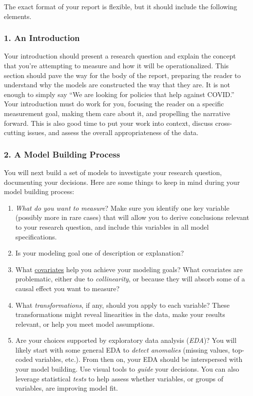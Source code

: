 \documentclass[
]{article}
\providecommand{\tightlist}{%
  \setlength{\itemsep}{0pt}\setlength{\parskip}{0pt}}
\begin{document}
The exact format of your report is flexible, but it should include the
following elements.

\hypertarget{an-introduction}{%
\subsubsection{1. An Introduction}\label{an-introduction}}

Your introduction should present a research question and explain the
concept that you're attempting to measure and how it will be
operationalized. This section should pave the way for the body of the
report, preparing the reader to understand why the models are
constructed the way that they are. It is not enough to simply say ``We
are looking for policies that help against COVID.'' Your introduction
must do work for you, focusing the reader on a specific measurement
goal, making them care about it, and propelling the narrative forward.
This is also good time to put your work into context, discuss
cross-cutting issues, and assess the overall appropriateness of the
data.

\hypertarget{a-model-building-process}{%
\subsubsection{2. A Model Building
Process}\label{a-model-building-process}}

You will next build a set of models to investigate your research
question, documenting your decisions. Here are some things to keep in
mind during your model building process:

\begin{enumerate}
\def\labelenumi{\arabic{enumi}.}
\tightlist
\item
  \emph{What do you want to measure}? Make sure you identify one key
  variable (possibly more in rare cases) that will allow you to derive
  conclusions relevant to your research question, and include this
  variables in all model specifications.
\item
  Is your modeling goal one of description or explanation?
\item
  What
  \href{https://en.wikipedia.org/wiki/Dependent_and_independent_variables\#Statistics_synonyms}{covariates}
  help you achieve your modeling goals? What covariates are problematic,
  either due to \emph{collinearity}, or because they will absorb some of
  a causal effect you want to measure?
\item
  What \emph{transformations}, if any, should you apply to each
  variable? These transformations might reveal linearities in the data,
  make your results relevant, or help you meet model assumptions.
\item
  Are your choices supported by exploratory data analysis (\emph{EDA})?
  You will likely start with some general EDA to \emph{detect anomalies}
  (missing values, top-coded variables, etc.). From then on, your EDA
  should be interspersed with your model building. Use visual tools to
  \emph{guide} your decisions. You can also leverage statistical
  \emph{tests} to help assess whether variables, or groups of variables,
  are improving model fit.
\end{enumerate}
\end{document}
